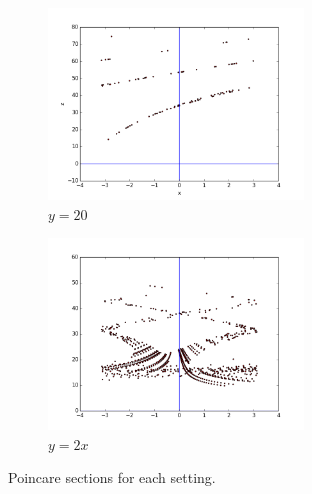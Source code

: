 \documentclass{article}
\begin{document}
\begin{figure}[h]
\centering
\begin{subfigure}{.5\textwidth}
  \centering
  \includegraphics[height=2in]{figs/q3/q3a.png}
  \caption{$y = 20$}
  \label{q31}
\end{subfigure}%
\begin{subfigure}{.5\textwidth}
  \centering
  \includegraphics[height=2in]{figs/q3/q3b_correct.png}
  \caption{$y = 2x$}
  \label{q32}
\end{subfigure}
\caption{Poincare sections for each setting.}
\label{q3}
\end{figure}
\end{document}
